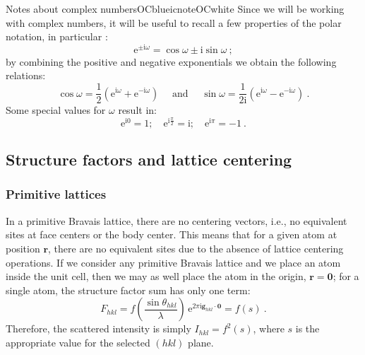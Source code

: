 \begin{messagebox}{Notes about complex numbers}{OCblue}{icnote}{OCwhite}
Since we will be working with complex numbers, it will be useful to recall a few properties of the polar notation, in particular :
\[
	\mathrm{e}^{\pm\mathrm{i}\omega} = \cos\omega\pm\mathrm{i}\sin\omega\ ;
\]
by combining the positive and negative exponentials we obtain the following relations:
\[
	\cos\omega = \frac{1}{2}\left(\mathrm{e}^{\mathrm{i}\omega}+\mathrm{e}^{-\mathrm{i}\omega}\right)\quad\text{ and }\quad
	\sin\omega = \frac{1}{2\mathrm{i}}\left(\mathrm{e}^{\mathrm{i}\omega}-\mathrm{e}^{-\mathrm{i}\omega}\right)\ .
\]
Some special values for $\omega$ result in:
\[
	\mathrm{e}^{\mathrm{i}0} = 1;\quad \mathrm{e}^{\mathrm{i}\frac{\pi}{2}} = \mathrm{i};\quad \mathrm{e}^{\mathrm{i}\pi} = -1\ .
\]
\end{messagebox}


\subsection{Structure factors and lattice centering}\label{\chabbr:ssec:SFcentering}

\subsubsection{Primitive lattices}
In a primitive Bravais lattice, there are no centering vectors, i.e., no equivalent sites at face centers or the body center. This means that for a given atom at position $\mathbf{r}$, there are no equivalent sites due to the absence of lattice centering operations.  If we consider any primitive Bravais lattice and we place an atom inside the unit cell, then we may as well place the atom in the origin, $\mathbf{r}=\mathbf{0}$; for a single atom, the structure factor sum has only one term:
\[
	F_{hkl} = f\left(\frac{\sin\theta_{hkl}}{\lambda}\right)\,\mathrm{e}^{2\pi\mathrm{i}\mathbf{g}_{hkl}\cdot\mathbf{0}} = f(s)\ .
\]
Therefore, the scattered intensity is simply $I_{hkl}=f^2(s)$, where $s$ is the appropriate value for the selected $(hkl)$ plane.

